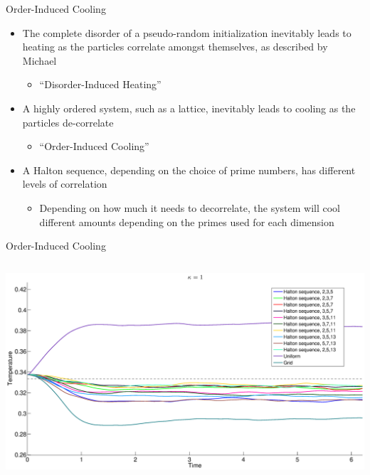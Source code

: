 \documentclass{beamer}
\begin{document}
	\begin{frame}{Order-Induced Cooling}
	\begin{itemize}
	\item The complete disorder of a pseudo-random initialization inevitably leads to heating as the particles correlate amongst themselves, as described by Michael\vspace{0.5em}
	\begin{itemize}
	\item ``Disorder-Induced Heating''
	\end{itemize}\vspace{0.5em}
	\item A highly ordered system, such as a lattice, inevitably leads to cooling as the particles de-correlate\vspace{0.5em}
	\begin{itemize}
	\item ``Order-Induced Cooling''
	\end{itemize}\vspace{0.5em}
	\item A Halton sequence, depending on the choice of prime numbers, has different levels of correlation\vspace{0.5em}
	\begin{itemize}
	\item Depending on how much it needs to decorrelate, the system will cool different amounts depending on the primes used for each dimension
	\end{itemize}
	
	\end{itemize}
	\end{frame}
	
	
	 

	\begin{frame}{Order-Induced Cooling}\begin{columns}
    \column{\dimexpr\paperwidth-12pt}
	\begin{center}\includegraphics[width=1\linewidth]{kappa1OIC.eps}\end{center}
	 \end{columns}
	\end{frame}
	
\end{document}
